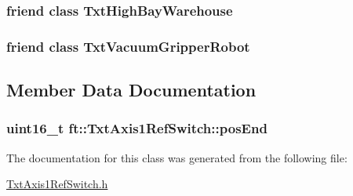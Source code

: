 \subsubsection[{\texorpdfstring{Txt\+High\+Bay\+Warehouse}{TxtHighBayWarehouse}}]{\setlength{\rightskip}{0pt plus 5cm}friend class {\bf Txt\+High\+Bay\+Warehouse}\hspace{0.3cm}{\ttfamily [friend]}}\hypertarget{classft_1_1_txt_axis1_ref_switch_ae0c44dc668d7ae80ecedb8484adf9fdf}{}\label{classft_1_1_txt_axis1_ref_switch_ae0c44dc668d7ae80ecedb8484adf9fdf}
\subsubsection[{\texorpdfstring{Txt\+Vacuum\+Gripper\+Robot}{TxtVacuumGripperRobot}}]{\setlength{\rightskip}{0pt plus 5cm}friend class {\bf Txt\+Vacuum\+Gripper\+Robot}\hspace{0.3cm}{\ttfamily [friend]}}\hypertarget{classft_1_1_txt_axis1_ref_switch_aea03938f89578033a66fa5dba1f9fe09}{}\label{classft_1_1_txt_axis1_ref_switch_aea03938f89578033a66fa5dba1f9fe09}


\subsection{Member Data Documentation}
\subsubsection[{\texorpdfstring{pos\+End}{posEnd}}]{\setlength{\rightskip}{0pt plus 5cm}uint16\+\_\+t ft\+::\+Txt\+Axis1\+Ref\+Switch\+::pos\+End\hspace{0.3cm}{\ttfamily [protected]}}\hypertarget{classft_1_1_txt_axis1_ref_switch_a8b9bda2c9ff12ef5f1355d630136e48b}{}\label{classft_1_1_txt_axis1_ref_switch_a8b9bda2c9ff12ef5f1355d630136e48b}


The documentation for this class was generated from the following file\+:\begin{DoxyCompactItemize}
\item 
\hyperlink{_txt_axis1_ref_switch_8h}{Txt\+Axis1\+Ref\+Switch.\+h}\end{DoxyCompactItemize}
